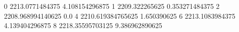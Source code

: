 0 2213.0771484375 4.108154296875
1 2209.322265625 0.353271484375
2 2208.968994140625 0.0
4 2210.619384765625 1.650390625
6 2213.1083984375 4.139404296875
8 2218.35595703125 9.386962890625
